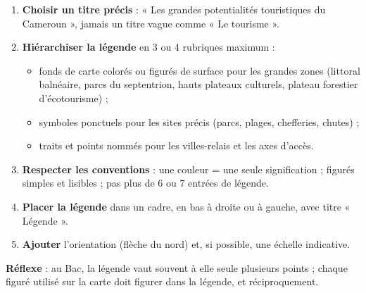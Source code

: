 \documentclass[11pt]{article}
\begin{document}
\begin{methode}
\begin{enumerate}
\item \textbf{Choisir un titre précis} : « Les grandes potentialités touristiques du Cameroun », jamais un titre vague comme « Le tourisme ».
\item \textbf{Hiérarchiser la légende} en 3 ou 4 rubriques maximum :
\begin{itemize}
\item fonds de carte colorés ou figurés de surface pour les grandes zones (littoral balnéaire, parcs du septentrion, hauts plateaux culturels, plateau forestier d'écotourisme) ;
\item symboles ponctuels pour les sites précis (parcs, plages, chefferies, chutes) ;
\item traits et points nommés pour les villes-relais et les axes d'accès.
\end{itemize}
\item \textbf{Respecter les conventions} : une couleur = une seule signification ; figurés simples et lisibles ; pas plus de 6 ou 7 entrées de légende.
\item \textbf{Placer la légende} dans un cadre, en bas à droite ou à gauche, avec titre « Légende ».
\item \textbf{Ajouter} l'orientation (flèche du nord) et, si possible, une échelle indicative.
\end{enumerate}
\textbf{Réflexe} : au Bac, la légende vaut souvent à elle seule plusieurs points ; chaque figuré utilisé sur la carte doit figurer dans la légende, et réciproquement.
\end{methode}
\end{document}
